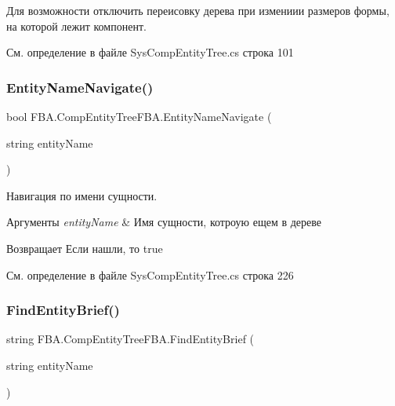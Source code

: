 Для возможности отключить переисовку дерева при измениии размеров формы, на которой лежит компонент. 



См. определение в файле Sys\+Comp\+Entity\+Tree.\+cs строка 101

\mbox{\label{class_f_b_a_1_1_comp_entity_tree_f_b_a_a00d71dd4b35dac8882641ce914ad92ed}} 
\subsubsection{\texorpdfstring{Entity\+Name\+Navigate()}{EntityNameNavigate()}}
{\footnotesize\ttfamily bool F\+B\+A.\+Comp\+Entity\+Tree\+F\+B\+A.\+Entity\+Name\+Navigate (\begin{DoxyParamCaption}\item[{string}]{entity\+Name }\end{DoxyParamCaption})}



Навигация по имени сущности. 


\begin{DoxyParams}{Аргументы}
{\em entity\+Name} & Имя сущности, котроую ещем в дереве\\
\hline
\end{DoxyParams}
\begin{DoxyReturn}{Возвращает}
Если нашли, то true
\end{DoxyReturn}


См. определение в файле Sys\+Comp\+Entity\+Tree.\+cs строка 226

\mbox{\label{class_f_b_a_1_1_comp_entity_tree_f_b_a_a8c03114e7847bd874a884cc1cecf1efe}} 
\subsubsection{\texorpdfstring{Find\+Entity\+Brief()}{FindEntityBrief()}}
{\footnotesize\ttfamily string F\+B\+A.\+Comp\+Entity\+Tree\+F\+B\+A.\+Find\+Entity\+Brief (\begin{DoxyParamCaption}\item[{string}]{entity\+Name }\end{DoxyParamCaption})}



